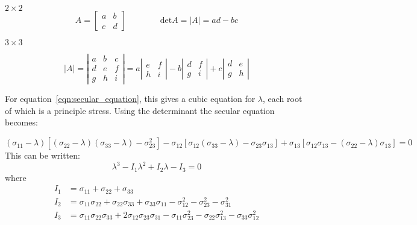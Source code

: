 \begin{annotation}
$2 \times 2$
$$
A = \begin{bmatrix}
a & b \\
c & d
\end{bmatrix} \qquad \qquad \text{det} A = |A| = ad - bc
$$

$3\times3$

$$
|A| = \left| \begin{matrix}
a & b & c \\
d & e & f \\
g & h & i
\end{matrix} 
\right| = a \left| 
\begin{matrix} 
e & f \\ h & i\end{matrix} \right|
- b \left| 
\begin{matrix} 
d & f \\ g & i\end{matrix} \right|
+ c \left| 
\begin{matrix}
d & e \\
g & h
\end{matrix}
\right|
$$
\end{annotation}



For equation~\ref{eqn:secular_equation}, this gives a cubic equation for $\lambda$, each root of which is a principle stress. Using the determinant the secular equation becomes:

\begin{equation}
(\sigma_{11} - \lambda)[(\sigma_{22} - \lambda)(\sigma_{33}-\lambda) - \sigma_{23}^2] - \sigma_{12}[\sigma_{12}(\sigma_{33}-\lambda)-\sigma_{23}\sigma_{13}] + \sigma_{13}[\sigma_{12}\sigma_{13} - (\sigma_{22}-\lambda)\sigma_{13}] = 0
\end{equation}
This can be written:
\begin{equation}
\lambda^3 - I_1 \lambda^2 + I_2 \lambda - I_3 = 0 \label{eqn:cubic_roots}
\end{equation}
where
\begin{align}
I_1 &= \sigma_{11} + \sigma_{22} + \sigma_{33} \nonumber \\
I_2 &= \sigma_{11} \sigma_{22} + \sigma_{22} \sigma_{33} + \sigma_{33} \sigma_{11} - \sigma_{12}^2 - \sigma_{23}^2 - \sigma_{31}^2 \\
I_3 &= \sigma_{11}\sigma_{22}\sigma_{33} + 2\sigma_{12}\sigma_{23}\sigma_{31} - \sigma_{11} \sigma_{23}^2 - \sigma_{22}\sigma_{13}^2 - \sigma_{33}\sigma_{12}^2 \nonumber
\end{align}

